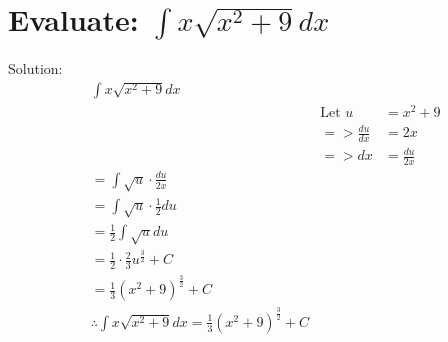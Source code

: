 \documentclass{article}
\begin{document}
\section{Evaluate: $\int x \sqrt{x^2 + 9} dx$} Solution:
\begin{align*}
     & \int x \sqrt{x^2 + 9} dx                                                                                           \\
     &                                                                               & \text{Let } u    & = x^2 + 9       \\
     &                                                                               & => \frac{du}{dx} & = 2x            \\
     &                                                                               & => dx            & = \frac{du}{2x} \\
     & = \int \sqrt{u} \cdot \frac{du}{2x}                                                                                \\
     & = \int \sqrt{u} \cdot \frac{1}{2} du                                                                               \\
     & = \frac{1}{2} \int \sqrt{u} du                                                                                     \\
     & = \frac{1}{2} \cdot \frac{2}{3} u^{\frac{3}{2}} + C                                                                \\
     & = \frac{1}{3} (x^2 + 9)^{\frac{3}{2}} + C                                                                          \\
     & \therefore \int x \sqrt{x^2 + 9} dx = \frac{1}{3} (x^2 + 9)^{\frac{3}{2}} + C
\end{align*}
\end{document}
